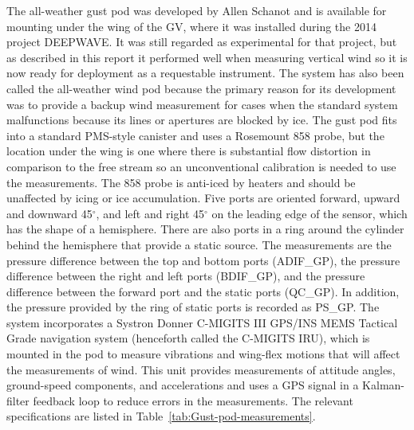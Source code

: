 \documentclass[12pt,twoside,english]{article}\usepackage[]{graphicx}\usepackage[]{color}
\let\OrgIndex\index
\renewcommand*{\index}[1]{\OrgIndex{#1}}
\begin{document}
The all-weather gust pod was developed by Allen Schanot and is available for mounting under the wing of the GV, where it was installed during the 2014 project DEEPWAVE. It was still regarded as experimental for that project, but as described in this report it performed well when measuring vertical wind so it is now ready for deployment as a requestable instrument. The system has also been called the all-weather wind pod because the primary reason for its development was to provide a backup wind measurement for cases when the standard system malfunctions because its lines or apertures are blocked by ice. The gust pod fits into a standard PMS-style canister and uses a Rosemount 858 probe, but the location under the wing is one where there is substantial flow distortion in comparison to the free stream so an unconventional calibration is needed to use the measurements. The 858 probe is anti-iced by heaters and should be unaffected by icing or ice accumulation. Five ports are oriented forward, upward and downward 45$^{\circ}$, and left and right 45$^{\circ}$ on the leading edge of the sensor, which has the shape of a hemisphere. There are also ports in a ring around the cylinder behind the hemisphere that provide a static source. The measurements are the pressure difference between the top and bottom ports (ADIF\_GP), the pressure difference between the right and left ports (BDIF\_GP), and the pressure difference between the forward port and the static ports (QC\_GP). In addition, the pressure provided by the ring of static ports is recorded as PS\_GP. The system incorporates a Systron Donner C-MIGITS III GPS/INS MEMS Tactical Grade navigation system (henceforth called the C-MIGITS IRU), which is mounted in the pod to measure vibrations and wing-flex motions that will affect the measurements of wind. This unit provides measurements of attitude angles, ground-speed components, and accelerations and uses a GPS signal in a Kalman-filter feedback loop to reduce errors in the measurements. The relevant specifications are listed in Table~\ref{tab:Gust-pod-measurements}. 
\end{document}
